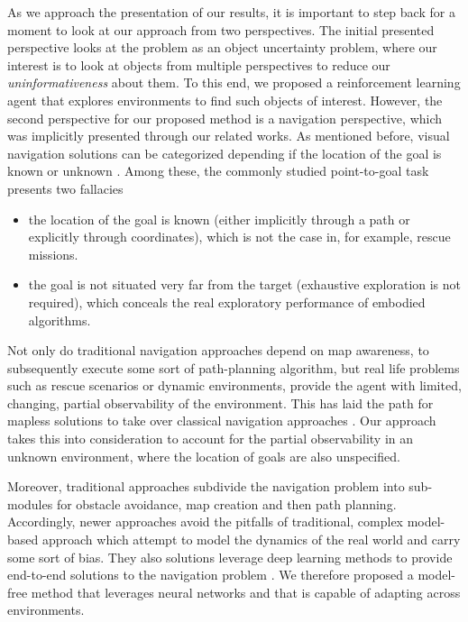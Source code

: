 As we approach the presentation of our results, it is important to step back for a moment to look at our approach from two perspectives. The initial presented perspective looks at the problem as an object uncertainty problem, where our interest is to look at objects from multiple perspectives to reduce our \textit{uninformativeness} about them. To this end, we proposed a reinforcement learning agent that explores environments to find such objects of interest.
However, the second perspective for our proposed method is a navigation perspective, which was implicitly presented through our related works. As mentioned before, visual navigation solutions can be categorized depending if the location of the goal is known or unknown \cite{chaplot2020semantic}. Among these, the commonly studied point-to-goal task presents two fallacies
\begin{itemize}
    \item the location of the goal is known (either implicitly through a path or explicitly through coordinates), which is not the case in, for example, rescue missions.
    \item the goal is not situated very far from the target (exhaustive exploration is not required), which conceals the real exploratory performance of embodied algorithms.
\end{itemize}

Not only do traditional navigation approaches depend on map awareness, to subsequently execute some sort of path-planning algorithm, but real life problems such as rescue scenarios or dynamic environments, provide the agent with limited, changing, partial observability of the environment. This has laid the path for mapless solutions to take over classical navigation approaches \cite{brandenburger2021mapless, xie2020snapnav, pfeiffer2018reinforced}. Our approach takes this into consideration to account for the partial observability in an unknown environment, where the location of goals are also unspecified.

Moreover, traditional approaches subdivide the navigation problem into sub-modules for obstacle avoidance, map creation and then path planning. Accordingly, newer approaches avoid the pitfalls of traditional, complex model-based approach which attempt to model the dynamics of the real world and carry some sort of bias. They also solutions leverage deep learning methods to provide end-to-end solutions to the navigation problem \cite{wang2018look, pfeiffer2018reinforced}. We therefore proposed a model-free method that leverages neural networks and that is capable of adapting across environments.  

